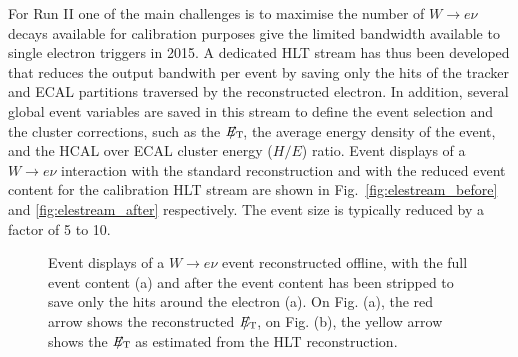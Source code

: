 \documentclass[journal]{IEEEtran}
\newcommand{\ETslash}{\ensuremath{E_{\mathrm{T}}\hspace{-1.1em}/\kern0.45em}}
\begin{document}
For Run II one of the main challenges is to maximise the number of $W\to e\nu$ decays available for calibration purposes give the limited bandwidth available to single electron triggers in 2015. A dedicated HLT stream has thus been developed that reduces the output bandwith per event by saving only the hits of the tracker and ECAL partitions traversed by the reconstructed electron. In addition, several global event variables are saved in this stream to define the event selection and the cluster corrections, such as the $\ETslash$, the average energy density of the event, and the HCAL over ECAL cluster energy ($H/E$) ratio. 
Event displays of a $W\to e \nu$ interaction with the standard reconstruction and with the reduced event content for the calibration HLT stream are shown in Fig.~\ref{fig:elestream_before} and \ref{fig:elestream_after} respectively. The event size is typically reduced by a factor of 5 to 10.
%
\begin{figure}[!t]
  \begin{center}
    \caption{Event displays of a $W\to e\nu$ event reconstructed offline, with the full event content (a) and after the event content has been stripped to save only the hits around the electron (a). On Fig. (a), the red arrow shows the reconstructed $\ETslash$, on Fig. (b), the yellow arrow shows the $\ETslash$ as estimated from the HLT reconstruction. \label{fig:elestream}}
  \end{center}
\end{figure}
%
\end{document}
